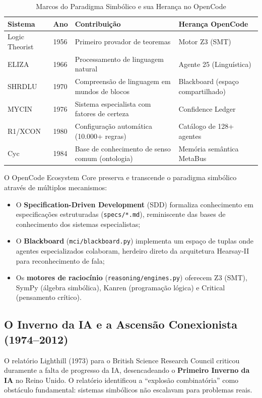 \begin{table}[htbp]
\centering
\caption{Marcos do Paradigma Simbólico e sua Herança no OpenCode}
\label{tab:symbolic_legacy}
\begin{tabular}{p{3cm}p{4cm}p{4cm}p{3cm}}
\hline
\textbf{Sistema} & \textbf{Ano} & \textbf{Contribuição} & \textbf{Herança OpenCode} \\
\hline
Logic Theorist & 1956 & Primeiro provador de teoremas & Motor Z3 (SMT) \\
ELIZA & 1966 & Processamento de linguagem natural & Agente 25 (Linguística) \\
SHRDLU & 1970 & Compreensão de linguagem em mundos de blocos & Blackboard (espaço compartilhado) \\
MYCIN & 1976 & Sistema especialista com fatores de certeza & Confidence Ledger \\
R1/XCON & 1980 & Configuração automática (10.000+ regras) & Catálogo de 128+ agentes \\
Cyc & 1984 & Base de conhecimento de senso comum (ontologia) & Memória semântica MetaBus \\
\hline
\end{tabular}
\end{table}

O OpenCode Ecosystem Core preserva e transcende o paradigma simbólico através de múltiplos mecanismos:
\begin{itemize}
    \item O \textbf{Specification-Driven Development} (SDD) formaliza conhecimento em especificações estruturadas (\texttt{specs/*.md}), reminiscente das bases de conhecimento dos sistemas especialistas;
    \item O \textbf{Blackboard} (\texttt{mci/blackboard.py}) implementa um espaço de tuplas onde agentes especializados colaboram, herdeiro direto da arquitetura Hearsay-II para reconhecimento de fala;
    \item Os \textbf{motores de raciocínio} (\texttt{reasoning/engines.py}) oferecem Z3 (SMT), SymPy (álgebra simbólica), Kanren (programação lógica) e Critical (pensamento crítico).
\end{itemize}

\subsection{O Inverno da IA e a Ascensão Conexionista (1974--2012)}

O relatório Lighthill (1973) \cite{lighthill1973artificial} para o British Science Research Council criticou duramente a falta de progresso da IA, desencadeando o \textbf{Primeiro Inverno da IA} no Reino Unido. O relatório identificou a ``explosão combinatória'' como obstáculo fundamental: sistemas simbólicos não escalavam para problemas reais.

